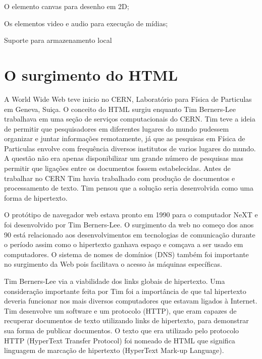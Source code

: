 \begin{alineas}

\item O elemento canvas para desenho em 2D;

\item Os elementos video e audio para execução de mídias;

\item Suporte para armazenamento local

\end{alineas}

\section{O surgimento do HTML}
A World Wide Web teve inicio no CERN, Laboratório para Física de Particulas em Geneva, Suiça. O conceito do HTML surgiu enquanto Tim Berners-Lee trabalhava em uma seção de serviços computacionais do CERN. Tim teve a ideia de permitir que pesquisadores em diferentes lugares do mundo pudessem organizar e juntar informações remotamente, já que as pesquisas em Física de Particulas envolve com frequência diversos institutos de varios lugares do mundo. A questão não era apenas disponibilizar um grande número de pesquisas mas permitir que ligações entre os documentos fossem estabelecidas. Antes de trabalhar no CERN Tim havia trabalhado com produção de documentos e processamento de texto. Tim pensou que a solução seria desenvolvida como uma forma de hipertexto.

O protótipo de navegador web estava pronto em 1990 para o computador NeXT e foi desenvolvido por Tim Berners-Lee. O surgimento da web no começo dos anos 90 está relacionado aos desenvolvimentos em tecnologias de comunicação durante o período assim como o hipertexto ganhava espaço e comçava a ser usado em computadores. O sistema de nomes de domínios (DNS) também foi importante no surgimento da Web pois facilitava o acesso às máquinas específicas.

Tim Berners-Lee via a viabilidade dos links globais de hipertexto. Uma consideração importante feita por Tim foi a importância de que tal hipertexto deveria funcionar nos mais diversos computadores que estavam ligados à Internet. Tim desenvolve um software e um protocolo (HTTP), que eram capazes de recuperar documentos de texto utilizando links de hipertexto, para demonstrar sua forma de publicar documentos. O texto que era utilizado pelo protocolo HTTP (HyperText Transfer Protocol) foi nomeado de HTML que significa linguagem de marcação de hipertexto (HyperText Mark-up Language).

